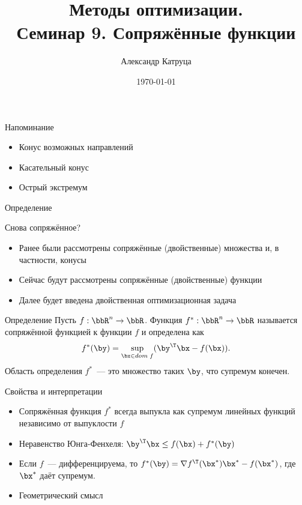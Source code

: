 \documentclass[12pt]{beamer}
\title[Семинар 9]{Методы оптимизации. \\
 Семинар 9. Сопряжённые функции}
\author{Александр Катруца}
\institute{Московский физико-технический институт,\\
Факультет Управления и Прикладной Математики}
\date{\today}
\begin{document}
\begin{frame}
\maketitle
\end{frame}

\begin{frame}{Напоминание}
\begin{itemize}
\item Конус возможных направлений
\item Касательный конус
\item Острый экстремум
\end{itemize}
\end{frame}

\begin{frame}{Определение}
\begin{block}{Снова сопряжённое?}
\begin{itemize}
\item Ранее были рассмотрены сопряжённые (двойственные) множества и, в частности, конусы
\item Сейчас будут рассмотрены сопряжённые (двойственные) функции
\item Далее будет введена двойственная оптимизационная задача 
\end{itemize}
\end{block}

\begin{block}{Определение}
Пусть $f: \bbR^n \rightarrow \bbR$. 
Функция $f^*: \bbR^n \rightarrow \bbR$ называется сопряжённой функцией к функции $f$ и определена как
\vspace{-4mm}
\[
f^*(\by) = \sup\limits_{\bx \in dom \; f} (\by^{\T}\bx - f(\bx)).
\vspace{-3mm}
\]
Область определения $f^*$~--- это множество таких $\by$, что супремум конечен. 

\end{block}
\end{frame}

\begin{frame}{Свойства и интерпретации}
\begin{itemize}
\item Сопряжённая функция $f^*$ всегда выпукла как супремум линейных функций независимо от выпуклости $f$
\item Неравенство Юнга-Фенхеля: $\by^{\T}\bx \leq f(\bx) + f^*(\by)$
\item Если $f$~--- дифференцируема, то $f^*(\by) = \nabla f^{\T}(\bx^*)\bx^* - f(\bx^*)$, где $\bx^*$ даёт супремум.
\item Геометрический смысл
\end{itemize}
\end{frame}
\end{document}
